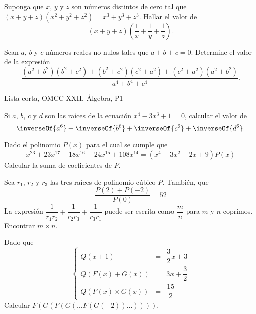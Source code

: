 \begin{section-problem}
    Suponga que $x$, $y$ y $z$ son números distintos de cero tal que $(x + y + z)(x^2 + y^2 + z^2) = x^3 + y^3 + z^3$.
    Hallar el valor de
    \[(x + y + z)\left(\frac{1}{x} + \frac{1}{y} + \frac{1}{z}\right).\]
\end{section-problem}

\begin{section-problem}
    Sean $a$, $b$ y $c$ números reales no nulos tales que $a + b + c = 0$.
    Determine el valor de la expresión
    \[\frac{(a^2 + b^2)(b^2 + c^2) + (b^2 + c^2)(c^2 + a^2) + (c^2 + a^2)(a^2 + b^2)}{a^4 + b^4 + c^4}.\]
    \begin{source-problem}
        Lista corta, OMCC XXII. Álgebra, P1
    \end{source-problem}
\end{section-problem}

\begin{section-problem}
    Si $a$, $b$, $c$ y $d$ son las raíces de la ecuación $x^4 - 3x^3 + 1 = 0$,
    calcular el valor de
    \[\inverseOf{a^6} + \inverseOf{b^6} + \inverseOf{c^6} + \inverseOf{d^6}.\]
\end{section-problem}



\begin{section-problem}
    Dado el polinomio $P(x)$ para el cual se cumple que
    \[x^{23} + 23x^{17} - 18x^{16} - 24x^{15} + 108x^{14} = (x^4 - 3x^2 - 2x + 9)P(x)\]
    Calcular la suma de coeficientes de $P$.
\end{section-problem}

\begin{section-problem}
    Sea $r_1$, $r_2$ y $r_3$ las tres raíces de polinomio cúbico $P$.
    También, que
    \[\frac{P(2) + P(-2)}{P(0)} = 52\]
    La expresión $\dfrac{1}{r_1 r_2} + \dfrac{1}{r_2 r_3} + \dfrac{1}{r_3 r_1}$ puede ser escrita como $\dfrac{m}{n}$ para $m$ y $n$ coprimos.
    Encontrar $m\times n$.
\end{section-problem}

\begin{section-problem}
    Dado que
    \[
        \left\{
        \begin{array}{rcl}
            Q(x + 1) & =& \dfrac{3}{2} x + 3\\
            Q( F(x) + G(x) ) & =& 3x + \dfrac{3}{2}\\
            Q( F(x) \times G(x) ) & =& \dfrac{15}{2}
        \end{array}
        \right.
    \]
    Calcular $F(G(F(G(\dots F(G(-2))\dots))))$.
\end{section-problem}

